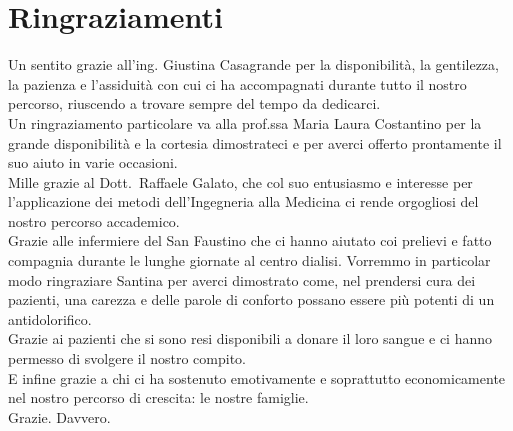 \chapter*{Ringraziamenti}

Un sentito grazie all'ing. Giustina Casagrande per la disponibilità, la gentilezza, la pazienza e l'assiduità con cui ci ha accompagnati durante tutto il nostro percorso, riuscendo a trovare sempre del tempo da dedicarci.
\vspace{10pt}\\
Un ringraziamento particolare va alla prof.ssa Maria Laura Costantino per la grande disponibilità e la cortesia dimostrateci  e per averci offerto prontamente il suo aiuto in varie occasioni.
\vspace{10pt}\\
Mille grazie al Dott.~Raffaele Galato, che col suo entusiasmo e interesse per l'applicazione dei metodi dell'Ingegneria alla Medicina ci rende orgogliosi del nostro percorso accademico.
\vspace{10pt}\\
Grazie alle infermiere del San Faustino che ci hanno aiutato coi prelievi e fatto compagnia durante le lunghe giornate al centro dialisi. Vorremmo in particolar modo ringraziare Santina per averci dimostrato come, nel prendersi cura dei pazienti, una carezza e delle parole di conforto possano essere più potenti di un antidolorifico.
\vspace{10pt}\\
Grazie ai pazienti che si sono resi disponibili a donare il loro sangue e ci hanno permesso di svolgere il nostro compito.
\vspace{10pt}\\
E infine grazie a chi ci ha sostenuto emotivamente e soprattutto economicamente nel nostro percorso di crescita: le nostre famiglie. 
\vspace{30pt}\\
Grazie. Davvero.

